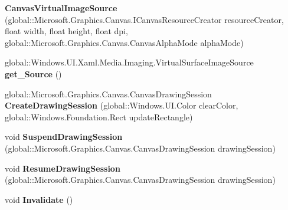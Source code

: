 \begin{DoxyCompactItemize}
{\bfseries Canvas\+Virtual\+Image\+Source} (global\+::\+Microsoft.\+Graphics.\+Canvas.\+I\+Canvas\+Resource\+Creator resource\+Creator, float width, float height, float dpi, global\+::\+Microsoft.\+Graphics.\+Canvas.\+Canvas\+Alpha\+Mode alpha\+Mode)
\item 
\mbox{\label{class_microsoft_1_1_graphics_1_1_canvas_1_1_u_i_1_1_xaml_1_1_canvas_virtual_image_source_a0b38413571f933a578e7b1e5d5956b0d}} 
global\+::\+Windows.\+U\+I.\+Xaml.\+Media.\+Imaging.\+Virtual\+Surface\+Image\+Source {\bfseries get\+\_\+\+Source} ()
\item 
\mbox{\label{class_microsoft_1_1_graphics_1_1_canvas_1_1_u_i_1_1_xaml_1_1_canvas_virtual_image_source_a751435fc921134c60f5373dd117a62da}} 
global\+::\+Microsoft.\+Graphics.\+Canvas.\+Canvas\+Drawing\+Session {\bfseries Create\+Drawing\+Session} (global\+::\+Windows.\+U\+I.\+Color clear\+Color, global\+::\+Windows.\+Foundation.\+Rect update\+Rectangle)
\item 
\mbox{\label{class_microsoft_1_1_graphics_1_1_canvas_1_1_u_i_1_1_xaml_1_1_canvas_virtual_image_source_aeec022e7d81700c461e1f6c2d1d80ecd}} 
void {\bfseries Suspend\+Drawing\+Session} (global\+::\+Microsoft.\+Graphics.\+Canvas.\+Canvas\+Drawing\+Session drawing\+Session)
\item 
\mbox{\label{class_microsoft_1_1_graphics_1_1_canvas_1_1_u_i_1_1_xaml_1_1_canvas_virtual_image_source_a97dd6bba6fd9c0fea9bc567785cb2e43}} 
void {\bfseries Resume\+Drawing\+Session} (global\+::\+Microsoft.\+Graphics.\+Canvas.\+Canvas\+Drawing\+Session drawing\+Session)
\item 
\mbox{\label{class_microsoft_1_1_graphics_1_1_canvas_1_1_u_i_1_1_xaml_1_1_canvas_virtual_image_source_a36a7e3ba8102ce00721b07b902b1f964}} 
void {\bfseries Invalidate} ()
\item 
\mbox{\label{class_microsoft_1_1_graphics_1_1_canvas_1_1_u_i_1_1_xaml_1_1_canvas_virtual_image_source_a9e05f0718686f31ebe81c8b975a09ecd}} 

\end{DoxyCompactItemize}
